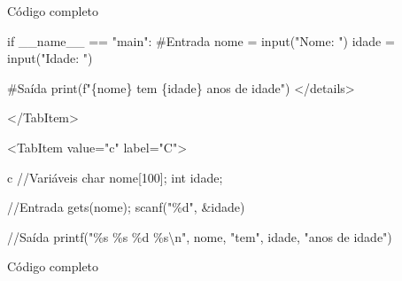 \documentclass[
  letterpaper,
  DIV=11,
  numbers=noendperiod]{scrreprt}
\newenvironment{Shaded}{\begin{snugshade}}{\end{snugshade}}
\newcommand{\BuiltInTok}[1]{\textcolor[rgb]{0.00,0.23,0.31}{#1}}
\newcommand{\CharTok}[1]{\textcolor[rgb]{0.13,0.47,0.30}{#1}}
\newcommand{\CommentTok}[1]{\textcolor[rgb]{0.37,0.37,0.37}{#1}}
\newcommand{\ControlFlowTok}[1]{\textcolor[rgb]{0.00,0.23,0.31}{#1}}
\newcommand{\DecValTok}[1]{\textcolor[rgb]{0.68,0.00,0.00}{#1}}
\newcommand{\NormalTok}[1]{\textcolor[rgb]{0.00,0.23,0.31}{#1}}
\newcommand{\OperatorTok}[1]{\textcolor[rgb]{0.37,0.37,0.37}{#1}}
\newcommand{\SpecialCharTok}[1]{\textcolor[rgb]{0.37,0.37,0.37}{#1}}
\newcommand{\SpecialStringTok}[1]{\textcolor[rgb]{0.13,0.47,0.30}{#1}}
\newcommand{\StringTok}[1]{\textcolor[rgb]{0.13,0.47,0.30}{#1}}
\newcommand{\VariableTok}[1]{\textcolor[rgb]{0.07,0.07,0.07}{#1}}
\begin{document}
Código completo

\begin{Shaded}
\begin{Highlighting}[]
    \ControlFlowTok{if} \VariableTok{\_\_name\_\_} \OperatorTok{==} \StringTok{"main"}\NormalTok{:}
      \CommentTok{\#Entrada}
\NormalTok{      nome }\OperatorTok{=} \BuiltInTok{input}\NormalTok{(}\StringTok{"Nome: "}\NormalTok{)}
\NormalTok{      idade }\OperatorTok{=} \BuiltInTok{input}\NormalTok{(}\StringTok{"Idade: "}\NormalTok{)}

      \CommentTok{\#Saída}
      \BuiltInTok{print}\NormalTok{(}\SpecialStringTok{f"}\SpecialCharTok{\{}\NormalTok{nome}\SpecialCharTok{\}}\SpecialStringTok{ tem }\SpecialCharTok{\{}\NormalTok{idade}\SpecialCharTok{\}}\SpecialStringTok{ anos de idade"}\NormalTok{)}
\NormalTok{    \textasciigrave{}\textasciigrave{}\textasciigrave{}}
  \OperatorTok{\textless{}/}\NormalTok{details}\OperatorTok{\textgreater{}}


  \OperatorTok{\textless{}/}\NormalTok{TabItem}\OperatorTok{\textgreater{}}

  \OperatorTok{\textless{}}\NormalTok{TabItem value}\OperatorTok{=}\StringTok{"c"}\NormalTok{ label}\OperatorTok{=}\StringTok{"C"}\OperatorTok{\textgreater{}}

\NormalTok{  \textasciigrave{}\textasciigrave{}\textasciigrave{}c}
  \OperatorTok{//}\NormalTok{Variáveis}
\NormalTok{  char nome[}\DecValTok{100}\NormalTok{]}\OperatorTok{;}
  \BuiltInTok{int}\NormalTok{ idade}\OperatorTok{;}

  \OperatorTok{//}\NormalTok{Entrada}
\NormalTok{  gets(nome)}\OperatorTok{;}
\NormalTok{  scanf(}\StringTok{"}\SpecialCharTok{\%d}\StringTok{"}\NormalTok{, }\OperatorTok{\&}\NormalTok{idade)}

  \OperatorTok{//}\NormalTok{Saída}
\NormalTok{  printf(}\StringTok{"}\SpecialCharTok{\%s}\StringTok{ }\SpecialCharTok{\%s}\StringTok{ }\SpecialCharTok{\%d}\StringTok{ }\SpecialCharTok{\%s}\CharTok{\textbackslash{}n}\StringTok{"}\NormalTok{, nome, }\StringTok{"tem"}\NormalTok{, idade, }\StringTok{"anos de idade"}\NormalTok{)}
\end{Highlighting}
\end{Shaded}

Código completo
\end{document}
